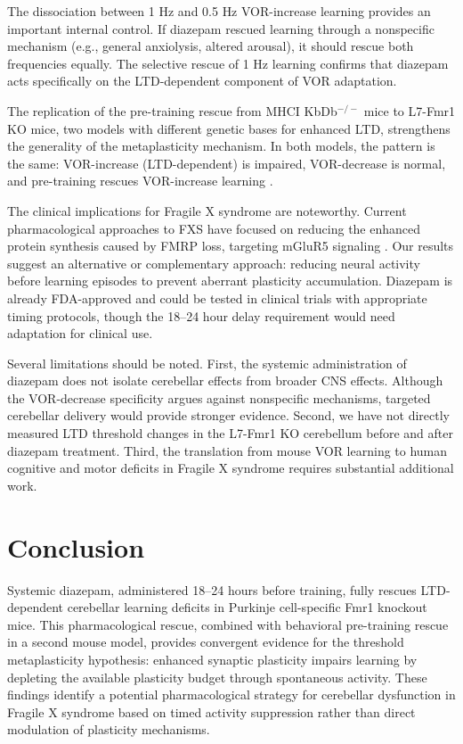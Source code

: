 \documentclass[11pt]{article}
\begin{document}
The dissociation between 1 Hz and 0.5 Hz VOR-increase learning provides an important internal control. If diazepam rescued learning through a nonspecific mechanism (e.g., general anxiolysis, altered arousal), it should rescue both frequencies equally. The selective rescue of 1 Hz learning confirms that diazepam acts specifically on the LTD-dependent component of VOR adaptation.

The replication of the pre-training rescue from MHCI KbDb$^{-/-}$ mice to L7-Fmr1 KO mice, two models with different genetic bases for enhanced LTD, strengthens the generality of the metaplasticity mechanism. In both models, the pattern is the same: VOR-increase (LTD-dependent) is impaired, VOR-decrease is normal, and pre-training rescues VOR-increase learning \citep{mcconnell2009}.

The clinical implications for Fragile X syndrome are noteworthy. Current pharmacological approaches to FXS have focused on reducing the enhanced protein synthesis caused by FMRP loss, targeting mGluR5 signaling \citep{berry-kravis2016}. Our results suggest an alternative or complementary approach: reducing neural activity before learning episodes to prevent aberrant plasticity accumulation. Diazepam is already FDA-approved and could be tested in clinical trials with appropriate timing protocols, though the 18--24 hour delay requirement would need adaptation for clinical use.

Several limitations should be noted. First, the systemic administration of diazepam does not isolate cerebellar effects from broader CNS effects. Although the VOR-decrease specificity argues against nonspecific mechanisms, targeted cerebellar delivery would provide stronger evidence. Second, we have not directly measured LTD threshold changes in the L7-Fmr1 KO cerebellum before and after diazepam treatment. Third, the translation from mouse VOR learning to human cognitive and motor deficits in Fragile X syndrome requires substantial additional work.

\section{Conclusion}

Systemic diazepam, administered 18--24 hours before training, fully rescues LTD-dependent cerebellar learning deficits in Purkinje cell-specific Fmr1 knockout mice. This pharmacological rescue, combined with behavioral pre-training rescue in a second mouse model, provides convergent evidence for the threshold metaplasticity hypothesis: enhanced synaptic plasticity impairs learning by depleting the available plasticity budget through spontaneous activity. These findings identify a potential pharmacological strategy for cerebellar dysfunction in Fragile X syndrome based on timed activity suppression rather than direct modulation of plasticity mechanisms.



\end{document}
